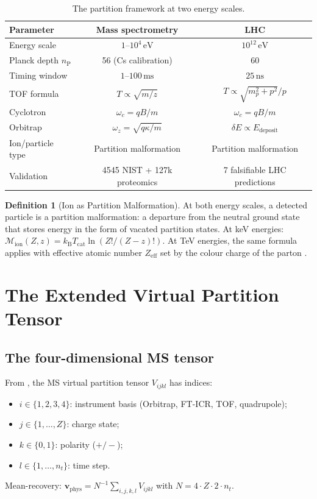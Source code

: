 \documentclass[twocolumn,10pt,a4paper]{article}
\theoremstyle{thmstyle}
\theoremstyle{definition}
\newtheorem{definition}[theorem]{Definition}
\theoremstyle{remark}
\newcommand{\kB}{k_{\mathrm{B}}}
\newcommand{\nP}{n_{\mathrm{P}}}
\newcommand{\Tcat}{T_{\mathrm{cat}}}
\newcommand{\Mop}{\mathcal{M}}
\begin{document}
\begin{table}[h]
\centering\small
\caption{The partition framework at two energy scales.}
\label{tab:scale}
\begin{tabular}{lcc}
\toprule
Parameter & Mass spectrometry & LHC \\
\midrule
Energy scale & $1$--$10^4\,\mathrm{eV}$ & $10^{12}\,\mathrm{eV}$ \\
Planck depth $\nP$ & 56 (Cs calibration) & 60 \\
Timing window & $1$--$100\,\mathrm{ms}$ & $25\,\mathrm{ns}$ \\
TOF formula & $T \propto \sqrt{m/z}$ & $T \propto \sqrt{m_p^2+p^2}/p$ \\
Cyclotron & $\omega_c = qB/m$ & $\omega_c = qB/m$ \\
Orbitrap & $\omega_z = \sqrt{q\kappa/m}$ & $\delta E \propto E_\text{deposit}$ \\
Ion/particle type & Partition malformation & Partition malformation \\
Validation & 4545 NIST + 127k proteomics & 7 falsifiable LHC predictions \\
\bottomrule
\end{tabular}
\end{table}

\begin{definition}[Ion as Partition Malformation]
At both energy scales, a detected particle is a partition malformation:
a departure from the neutral ground state that stores energy in the form
of vacated partition states.  At keV energies:
$\Mop_{\mathrm{ion}}(Z,z) = \kB\Tcat\ln(Z!/(Z-z)!)$.
At TeV energies, the same formula applies with effective atomic number
$Z_\text{eff}$ set by the colour charge of the parton \citep{companion:spectrometer}.
\end{definition}

\section{The Extended Virtual Partition Tensor}
\label{sec:tensor}

\subsection{The four-dimensional MS tensor}

From \citet{companion:tensor}, the MS virtual partition tensor $V_{ijkl}$
has indices:
\begin{itemize}[nosep]
\item $i \in \{1,2,3,4\}$: instrument basis (Orbitrap, FT-ICR, TOF, quadrupole);
\item $j \in \{1,\ldots,Z\}$: charge state;
\item $k \in \{0,1\}$: polarity ($+/-$);
\item $l \in \{1,\ldots,n_t\}$: time step.
\end{itemize}
Mean-recovery: $\mathbf{v}_\text{phys} = N^{-1}\sum_{i,j,k,l} V_{ijkl}$
with $N = 4 \cdot Z \cdot 2 \cdot n_t$.
\end{document}
